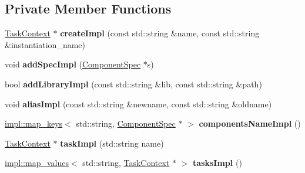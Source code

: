 \subsection*{Private Member Functions}
\begin{DoxyCompactItemize}
\item 
\hypertarget{classcoco_1_1_component_registry_a1ca3846fac7739e8374b6a1c44d31228}{}\hyperlink{classcoco_1_1_task_context}{Task\+Context} $\ast$ {\bfseries create\+Impl} (const std\+::string \&name, const std\+::string \&instantiation\+\_\+name)\label{classcoco_1_1_component_registry_a1ca3846fac7739e8374b6a1c44d31228}

\item 
\hypertarget{classcoco_1_1_component_registry_a83bdd0d96933075e5d975c021b44e091}{}void {\bfseries add\+Spec\+Impl} (\hyperlink{classcoco_1_1_component_spec}{Component\+Spec} $\ast$s)\label{classcoco_1_1_component_registry_a83bdd0d96933075e5d975c021b44e091}

\item 
\hypertarget{classcoco_1_1_component_registry_a6770d126e09fe3249a32d160ad0c2ae9}{}bool {\bfseries add\+Library\+Impl} (const std\+::string \&lib, const std\+::string \&path)\label{classcoco_1_1_component_registry_a6770d126e09fe3249a32d160ad0c2ae9}

\item 
\hypertarget{classcoco_1_1_component_registry_ade0c2b64b60c7d1eba6de2f01b989077}{}void {\bfseries alias\+Impl} (const std\+::string \&newname, const std\+::string \&oldname)\label{classcoco_1_1_component_registry_ade0c2b64b60c7d1eba6de2f01b989077}

\item 
\hypertarget{classcoco_1_1_component_registry_a0be22b7f2ddab298389e87f02eceb4a8}{}\hyperlink{structcoco_1_1impl_1_1map__keys}{impl\+::map\+\_\+keys}$<$ std\+::string, \hyperlink{classcoco_1_1_component_spec}{Component\+Spec} $\ast$ $>$ {\bfseries components\+Name\+Impl} ()\label{classcoco_1_1_component_registry_a0be22b7f2ddab298389e87f02eceb4a8}

\item 
\hypertarget{classcoco_1_1_component_registry_a163ad5a04694425e85c538879fb2e295}{}\hyperlink{classcoco_1_1_task_context}{Task\+Context} $\ast$ {\bfseries task\+Impl} (std\+::string name)\label{classcoco_1_1_component_registry_a163ad5a04694425e85c538879fb2e295}

\item 
\hypertarget{classcoco_1_1_component_registry_ac618873b3a7ebe5b93fb4770e60f0404}{}\hyperlink{structcoco_1_1impl_1_1map__values}{impl\+::map\+\_\+values}$<$ std\+::string, \hyperlink{classcoco_1_1_task_context}{Task\+Context} $\ast$ $>$ {\bfseries tasks\+Impl} ()\label{classcoco_1_1_component_registry_ac618873b3a7ebe5b93fb4770e60f0404}

\end{DoxyCompactItemize}

